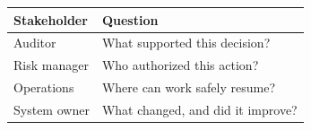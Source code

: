 \begin{tabular}{@{}P{4.0cm}P{8.5cm}@{}}
\toprule
\textbf{Stakeholder} & \textbf{Question} \\
\midrule
Auditor & What supported this decision? \\
Risk manager & Who authorized this action? \\
Operations & Where can work safely resume? \\
System owner & What changed, and did it improve? \\
\bottomrule
\end{tabular}

